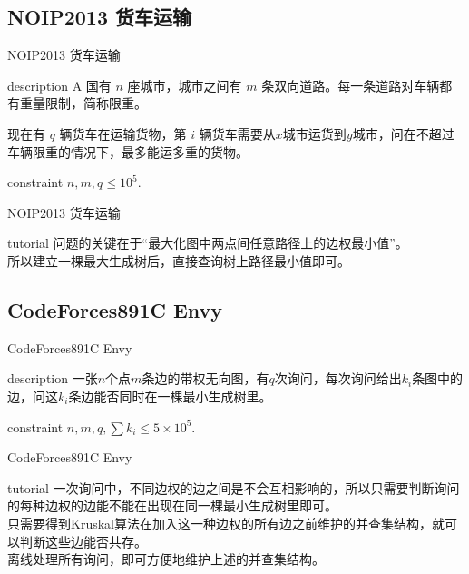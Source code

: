 \documentclass{beamer}
\begin{document}
\subsection{NOIP2013 货车运输}
\begin{frame}{NOIP2013 货车运输}
	\begin{block}{description}
		A 国有 $n$ 座城市，城市之间有 $m$ 条双向道路。每一条道路对车辆都有重量限制，简称限重。
		
		现在有 $q$ 辆货车在运输货物，第 $i$ 辆货车需要从$x$城市运货到$y$城市，问在不超过车辆限重的情况下，最多能运多重的货物。
		
	\end{block}
	\begin{block}{constraint}
		$n, m, q \le 10^5.$
	\end{block}
\end{frame}
\begin{frame}{NOIP2013 货车运输}
	\begin{block}{tutorial}
		问题的关键在于“最大化图中两点间任意路径上的边权最小值”。\\
		
		所以建立一棵最大生成树后，直接查询树上路径最小值即可。
	\end{block}
\end{frame}


\subsection{CodeForces891C Envy}
\begin{frame}{CodeForces891C Envy}
	\begin{block}{description}
		一张$n$个点$m$条边的带权无向图，有$q$次询问，每次询问给出$k_i$条图中的边，问这$k_i$条边能否同时在一棵最小生成树里。
	\end{block}
	\begin{block}{constraint}
		$n, m, q, \sum k_i \le 5 \times 10^5.$
	\end{block}
\end{frame}
\begin{frame}{CodeForces891C Envy}
	\begin{block}{tutorial}
		一次询问中，不同边权的边之间是不会互相影响的，所以只需要判断询问的每种边权的边能不能在出现在同一棵最小生成树里即可。\\
		
		只需要得到Kruskal算法在加入这一种边权的所有边之前维护的并查集结构，就可以判断这些边能否共存。\\
		
		离线处理所有询问，即可方便地维护上述的并查集结构。
	\end{block}
\end{frame}
\end{document}
